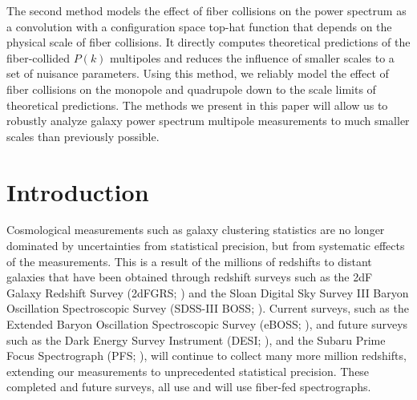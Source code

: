 \qquad The second method models the effect of fiber collisions on the power spectrum as a convolution with a configuration space top-hat function that depends on the physical scale of fiber collisions. It directly computes theoretical predictions of the fiber-collided $P(k)$ multipoles and reduces the influence of smaller scales to a set of nuisance parameters. Using this method, we reliably model the effect of fiber collisions on the monopole and quadrupole down to the scale limits of theoretical predictions. The methods we present in this paper will allow us to robustly analyze galaxy power spectrum multipole measurements to much smaller scales than previously possible.


\section{Introduction} 
Cosmological measurements such as galaxy clustering statistics are
no longer dominated by uncertainties from statistical precision, but from 
systematic effects of the measurements. This is a result of the millions of 
redshifts to distant galaxies that have been obtained through redshift surveys
such as the 2dF Galaxy Redshift Survey (2dFGRS; \citealt{Colless:1999aa}) and 
the Sloan Digital Sky Survey III Baryon Oscillation Spectroscopic Survey 
(SDSS-III BOSS; \citealt{Anderson:2012aa, Dawson:2013aa}). Current surveys, 
such as the Extended Baryon Oscillation Spectroscopic Survey (eBOSS; \citealt{Dawson:2015aa}), 
and future surveys such as the Dark Energy Survey Instrument (DESI; \citealt{Schlegel:2011aa, 
Morales:2012aa, Makarem:2014aa}), and the Subaru Prime Focus Spectrograph 
(PFS; \citealt{Takada:2014aa}), 
will continue to collect many more million redshifts, extending our measurements 
to unprecedented statistical precision. These completed and future surveys, all use 
and will use fiber-fed spectrographs. 


